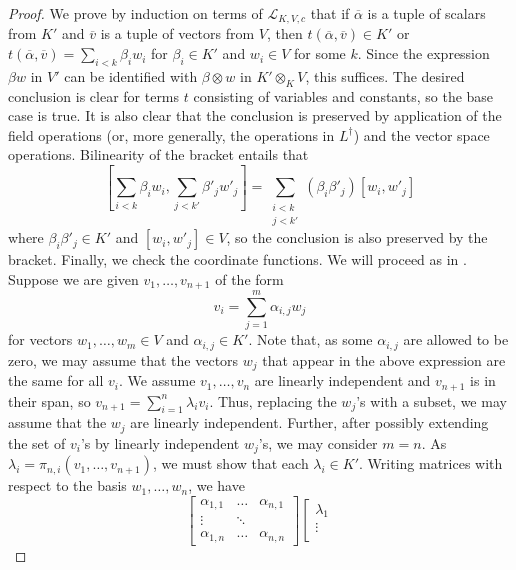 \documentclass[psamsfonts]{amsart}
\theoremstyle{definition}
\theoremstyle{definition}
\theoremstyle{remark}
\numberwithin{equation}{section}
\newcommand\LL{\mathscr{L}}
\begin{document}
\begin{proof}
    We prove by induction on terms of $\LL_{K,V,c}$ that if $\overline{\alpha}$ is a tuple of scalars from $K'$ and $\overline{v}$ is a tuple of vectors from $V$, then $t(\overline{\alpha}, \overline{v}) \in K'$ or $t(\overline{\alpha},\overline{v}) = \sum_{i < k} \beta_{i} w_{i}$ for $\beta_{i} \in K'$ and $w_{i} \in V$ for some $k$. Since the expression $\beta w$ in $V'$ can be identified with $\beta \otimes w$ in $K' \otimes_{K} V$, this suffices. The desired conclusion is clear for terms $t$ consisting of variables and constants, so the base case is true. It is also clear that the conclusion is preserved by application of the field operations (or, more generally, the operations in $L^{\dagger}$) and the vector space operations.  Bilinearity of the bracket entails that 
    $$
    \left[\sum_{i < k}\beta_{i} w_{i}, \sum_{j < k'}\beta'_{j}w'_{j}\right] = \sum_{\substack{i < k\\j < k'}} (\beta_{i} \beta'_{j})[w_{i},w'_{j}]
    $$
    where $\beta_{i} \beta'_{j} \in K'$ and $[w_{i},w'_{j}] \in V$, so the conclusion is also preserved by the bracket. Finally, we check the coordinate functions.  We will proceed as in \cite[Lemma 1.5]{nickandlotte}. Suppose we are given $v_{1}, \ldots, v_{n+1}$ of the form 
    $$
    v_{i} = \sum_{j = 1}^{m} \alpha_{i,j} w_{j}
    $$
    for vectors $w_{1}, \ldots, w_{m} \in V$ and $\alpha_{i,j} \in K'$. Note that, as some $\alpha_{i,j}$ are allowed to be zero, we may assume that the vectors $w_{j}$ that appear in the above expression are the same for all $v_{i}$. We assume $v_{1}, \ldots, v_{n}$ are linearly independent and $v_{n+1}$ is in their span, so $v_{n+1} = \sum_{i = 1}^{n} \lambda_{i} v_{i}$. Thus, replacing the $w_{j}$'s with a subset, we may assume that the $w_{j}$ are linearly independent. Further, after possibly extending the set of $v_i$'s by linearly independent $w_j$'s, we may consider $m = n$. As $\lambda_{i} = \pi_{n,i}(v_{1}, \ldots, v_{n+1})$, we must show that each $\lambda_{i} \in K'$.  Writing matrices with respect to the basis $w_{1}, \ldots, w_{n}$, we have 
    $$
\left[ 
\begin{matrix}
    \alpha_{1,1} & \ldots & \alpha_{n,1} \\
    \vdots & \ddots & \\
    \alpha_{1,n} & \dots & \alpha_{n,n} 
\end{matrix}
\right] \left[
\begin{matrix}
    \lambda_{1}  \\
    \vdots \\

\end{matrix}$$
\end{proof}
\end{document}
